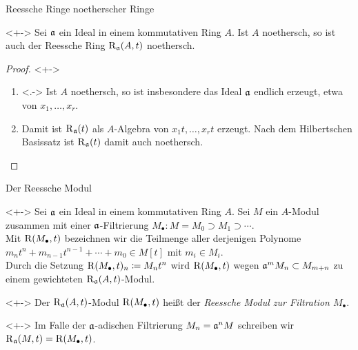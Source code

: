 \begin{frame}{Reessche Ringe noetherscher Ringe}
	\begin{proposition}<+->
		Sei \(\mathfrak{a}\) ein Ideal in einem kommutativen Ring \(A\). Ist
		\(A\) noethersch, so ist auch der Reessche Ring
		\(\operatorname{R}_{\mathfrak{a}}(A, t)\) noethersch.
	\end{proposition}
	\begin{proof}<+->
		\begin{enumerate}[<+->]
		\item<.->
			Ist \(A\) noethersch, so ist insbesondere das Ideal \(\mathfrak{a}\)
			endlich erzeugt, etwa von \(x_1, \dotsc, x_r\).
		\item
			Damit ist \(\operatorname{R}_{\mathfrak{a}}(t)\) als \(A\)-Algebra von
			\(x_1 t, \dotsc, x_r t\) erzeugt. Nach dem Hilbertschen Basissatz
			ist \(\operatorname{R}_{\mathfrak{a}}(t)\) damit auch noethersch.
			\qedhere
		\end{enumerate}
	\end{proof}
\end{frame}

\begin{frame}{Der Reessche Modul}
	\begin{visibleenv}<+->
		Sei \(\mathfrak{a}\) ein Ideal in einem kommutativen Ring \(A\). Sei
		\(M\) ein \(A\)-Modul zusammen mit einer \(\mathfrak{a}\)-Filtrierung
		\(M_\bullet\colon M = M_0 \supset M_1 \supset \dotsb\). 
		\\
		Mit \(\operatorname{R}(M_\bullet, t)\) bezeichnen wir die Teilmenge aller derjenigen
		Polynome \(m_n t^n + m_{n - 1} t^{n - 1} + \dotsb + m_0 \in M[t]\)
		mit \(m_i \in M_i\).
		\\
		Durch die Setzung \(\operatorname{R}(M_\bullet, t)_n \coloneqq M_n t^n\) wird
		\(\operatorname{R}(M_\bullet, t)\) wegen \(\mathfrak{a}^m M_n \subset M_{m + n}\)
		zu einem gewichteten \(\operatorname{R}_{\mathfrak{a}}(A, t)\)-Modul.
	\end{visibleenv}
	\begin{definition}<+->
		Der \(\operatorname{R}_{\mathfrak{a}}(A, t)\)-Modul \(\operatorname{R}(M_\bullet, t)\) heißt der
		\emph{Reessche Modul zur Filtration \(M_\bullet\)}.
	\end{definition}
	\begin{notation}<+->
		Im Falle der \(\mathfrak{a}\)-adischen Filtrierung \(M_n = \mathfrak{a}^n M\) schreiben wir
		\(\operatorname{R}_{\mathfrak{a}}(M, t) = \operatorname{R}(M_\bullet, t)\).
	\end{notation}
\end{frame}

